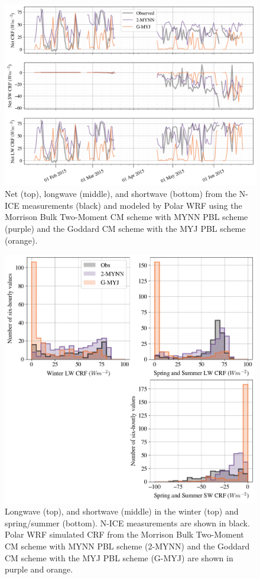 \begin{figure}[t]
    \centering
    \includegraphics[width=1\linewidth]{figures/chapter4/CRF_TS.png}
    \caption[Time series of cloud radiative forcing in two WRF model runs.]{Net (top), longwave (middle), and shortwave (bottom) from the N-ICE measurements (black) and modeled by Polar WRF using the Morrison Bulk Two-Moment CM scheme with MYNN PBL scheme (purple) and the Goddard CM scheme with the MYJ PBL scheme (orange).}
    \label{wrf:fig_crf_all}
\end{figure}
\begin{figure}[p!]
    \centering
    \includegraphics[width=1\linewidth]{figures/chapter4/CRF_Histos.png}
    \caption[Histograms of cloud radiative forcing in two WRF model runs.]{Longwave (top), and shortwave (middle) in the winter (top) and spring/summer (bottom). N-ICE measurements  are shown in black. Polar WRF simulated CRF from the Morrison Bulk Two-Moment CM scheme with MYNN PBL scheme (2-MYNN) and the Goddard CM scheme with the MYJ PBL scheme (G-MYJ) are shown in purple and orange.}
    \label{wrf:fig_crf_his}
\end{figure}

